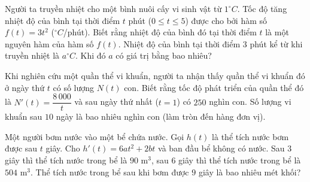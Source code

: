 \begin{ex}%
Người ta truyền nhiệt cho một bình nuôi cấy vi sinh vật từ $1^\circ C$. Tốc độ tăng nhiệt độ của bình tại thời điểm $t$ phút ($0 \le t \le 5$) được cho bởi hàm số $f(t) = 3t^2$ ($^\circ C$/phút). Biết rằng nhiệt độ của bình đó tại thời điểm $t$ là một nguyên hàm của hàm số $f(t)$. Nhiệt độ của bình tại thời điểm $3$ phút kể từ khi truyền nhiệt là $a^\circ C$. Khi đó $a$ có giá trị bằng bao nhiêu?
\par{}
\end{ex}

\begin{ex}%
Khi nghiên cứu một quần thể vi khuẩn, người ta nhận thấy quần thể vi khuẩn đó ở ngày thứ $t$ có số lượng $N(t)$ con. Biết rằng tốc độ phát triển của quần thể đó là $N'(t) = \dfrac{8\,000}{t}$ và sau ngày thứ nhất ($t=1$) có $250$ nghìn con. Số lượng vi khuẩn sau $10$ ngày là bao nhiêu nghìn con (làm tròn đến hàng đơn vị).
\end{ex}

\begin{ex}%
Một người bơm nước vào một bể chứa nước. Gọi $h(t)$ là thể tích nước bơm được sau $t$ giây. Cho $h'(t)=6at^2+2bt$ và ban đầu bể không có nước. Sau $3$ giây thì thể tích nước trong bể là $90$ m$^3$, sau $6$ giây thì thể tích nước trong bể là $504$ m$^3$. Thể tích nước trong bể sau khi bơm được $9$ giây là bao nhiêu mét khối?
\par
{}
\end{ex}

